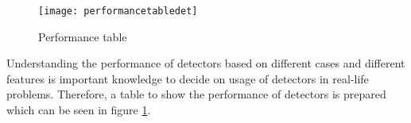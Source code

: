 \documentclass{article}
\begin{document}
\setlength{\parindent}{6ex}

\begin{figure}
    \centering
    \texttt{[image: performancetabledet]}
    \caption{Performance table}
    \label{fig:performancetable1}
\end{figure}

\indent

Understanding the performance of detectors based on different cases and different 
features is important knowledge to decide on usage of detectors in real-life problems. 
Therefore, a table to show the performance of detectors is prepared which can be 
seen in figure \ref{fig:performancetable1}.
\end{document}
